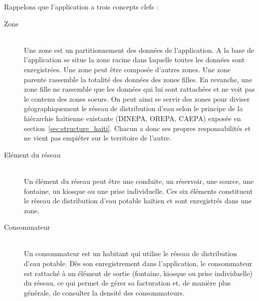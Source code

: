 \documentclass{EPL-master-thesis-covers-FR}
\begin{document}

				Rappelons que l'application a trois concepts clefs :
				\begin{description}
					\item[Zone] \hfill \\
						Une zone est un partitionnement des données de l'application. A la base de l'application se situe la zone racine dans laquelle toutes les données sont enregistrées. Une zone peut être composée d'autres zones. Une zone parente rassemble la totalité des données des zones filles. En revanche, une zone fille ne rassemble que les données qui lui sont rattachées et ne voit pas le contenu des zones soeurs. On peut ainsi se servir des zones pour diviser géographiquement le réseau de distribution d'eau selon le principe de la hiérarchie haïtienne existante (DINEPA, OREPA, CAEPA) exposée en section~\ref{sec:structure_haiti}. Chacun a donc ses propres responsabilités et ne vient pas empiéter sur le territoire de l'autre.
					\item[Elément du réseau] \hfill \\
						Un élément du réseau peut être une conduite, un réservoir, une source, une fontaine, un kiosque ou une prise individuelle. Ces six éléments constituent le réseau de distribution d'eau potable haïtien et sont enregistrés dans une zone.
					\item[Consommateur] \hfill \\
						Un consommateur est un habitant qui utilise le réseau de distribution d'eau potable. Dès son enregistrement dans l'application, le consommateur est rattaché à un élément de sortie (fontaine, kiosque ou prise individuelle) du réseau, ce qui permet de gérer sa facturation et, de manière plus générale, de consulter la densité des consommateurs.
				\end{description}
\end{document}
